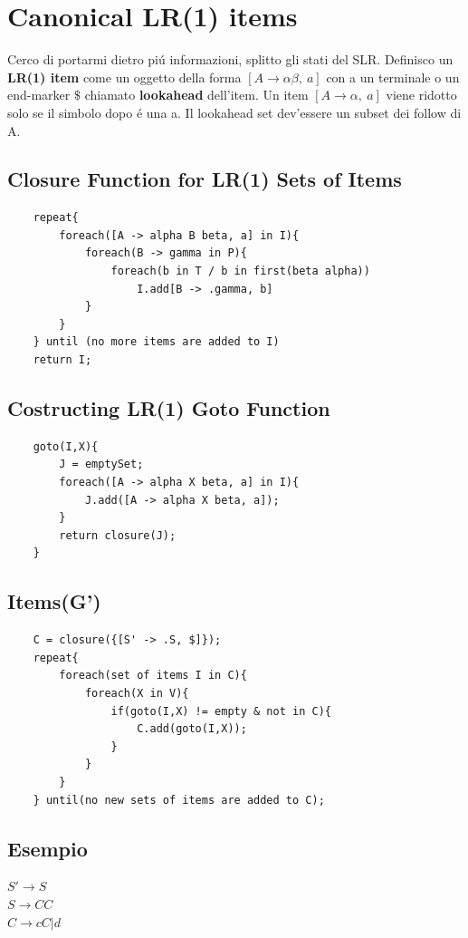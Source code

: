 \section{Canonical LR(1) items}
Cerco di portarmi dietro pi\'u informazioni, splitto gli stati del SLR. Definisco un \textbf{LR(1) item} come un oggetto della forma 
$[A \rightarrow \alpha\beta ,\ a]$ con a un terminale o un end-marker $\$$ chiamato \textbf{lookahead} dell'item.
Un item $[A \rightarrow \alpha ,\ a]$ viene ridotto solo se il simbolo dopo \'e una a. Il lookahead set dev'essere un subset dei follow di A.

\subsection{Closure Function for LR(1) Sets of Items}
\begin{lstlisting}
    repeat{
        foreach([A -> alpha B beta, a] in I){
            foreach(B -> gamma in P){
                foreach(b in T / b in first(beta alpha))
                    I.add[B -> .gamma, b]
            }
        }
    } until (no more items are added to I)
    return I;
\end{lstlisting}

\subsection{Costructing LR(1) Goto Function}
\begin{lstlisting}
    goto(I,X){
        J = emptySet;
        foreach([A -> alpha X beta, a] in I){
            J.add([A -> alpha X beta, a]);
        }
        return closure(J);
    }
\end{lstlisting}

\subsection{Items(G')}
\begin{lstlisting}
    C = closure({[S' -> .S, $]});
    repeat{
        foreach(set of items I in C){
            foreach(X in V){
                if(goto(I,X) != empty & not in C){
                    C.add(goto(I,X));
                }
            }
        }
    } until(no new sets of items are added to C);
\end{lstlisting}

\subsection{Esempio}
$S' \rightarrow S$\\
$S \rightarrow CC$\\
$C \rightarrow cC|d$\\

